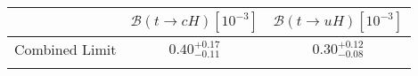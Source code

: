
\centering
\begin{tabular}{ccc} \toprule\toprule
 & $\mathcal{B}(t\to cH)[10^{-3}]$ & $\mathcal{B}(t\to uH)[10^{-3}]$\\\midrule
Combined Limit & $0.40^{+0.17}_{-0.11}$ & $0.30^{+0.12}_{-0.08}$\\
\bottomrule\bottomrule\\
\end{tabular}